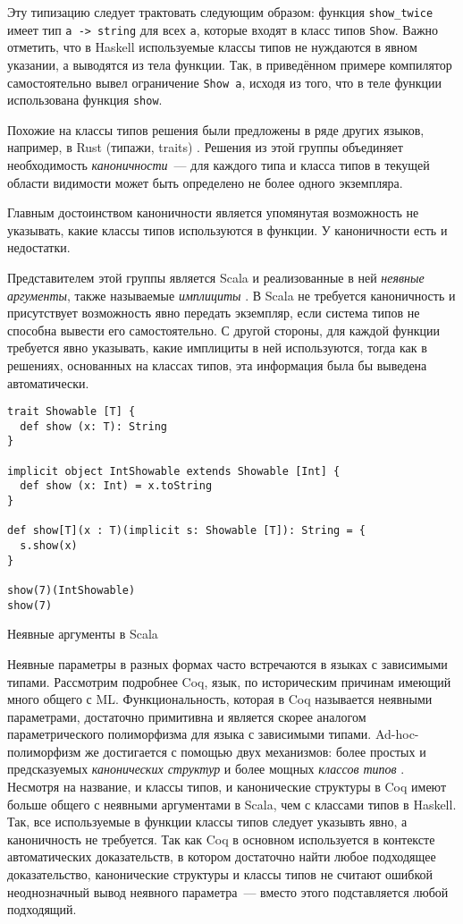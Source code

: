 \documentclass[../diploma.tex]{subfiles}
\begin{document}
Эту типизацию следует трактовать следующим образом: функция \texttt{show\_twice} имеет тип \texttt{a -> string} для всех \texttt{a}, которые входят в класс типов \texttt{Show}. Важно отметить, что в Haskell используемые классы типов не нуждаются в явном указании, а выводятся из тела функции. Так, в приведённом примере компилятор самостоятельно вывел ограничение \texttt{Show a}, исходя из того, что в теле функции использована функция \texttt{show}.

Похожие на классы типов решения были предложены в ряде других языков, например, в Rust (типажи, traits) \cite{rust}. Решения из этой группы объединяет необходимость \textit{каноничности}~--- для каждого типа и класса типов в текущей области видимости может быть определено не более одного экземпляра.

Главным достоинством каноничности является упомянутая возможность не указывать, какие классы типов используются в функции. У каноничности есть и недостатки. 

Представителем этой группы является Scala и реализованные в ней \textit{неявные аргументы}, также называемые \textit{имплициты} \cite{implicits}. В Scala не требуется каноничность и присутствует возможность явно передать экземпляр, если система типов не способна вывести его самостоятельно. С другой стороны, для каждой функции требуется явно указывать, какие имплициты в ней используются, тогда как в решениях, основанных на классах типов, эта информация была бы выведена автоматически.

\begin{listing}[H]
\begin{verbatim}
trait Showable [T] { 
  def show (x: T): String
}

implicit object IntShowable extends Showable [Int] {
  def show (x: Int) = x.toString
}

def show[T](x : T)(implicit s: Showable [T]): String = {
  s.show(x)
}

show(7)(IntShowable)
show(7)
\end{verbatim}
\caption{Неявные аргументы в Scala}
\label{lst:label}
\end{listing}

Неявные параметры в разных формах часто встречаются в языках с зависимыми типами. Рассмотрим подробнее Coq, язык, по историческим причинам имеющий много общего с ML. Функциональность, которая в Coq называется неявными параметрами, достаточно примитивна и является скорее аналогом параметрического полиморфизма для языка с зависимыми типами. Ad-hoc-полиморфизм же достигается с помощью двух механизмов: более простых и предсказуемых \textit{канонических структур} \cite{canonical_structures} и более мощных \textit{классов типов} \cite{coq_typeclasses}. Несмотря на название, и классы типов, и канонические структуры в Coq имеют больше общего с неявными аргументами в Scala, чем с классами типов в Haskell. Так, все используемые в функции классы типов следует указывть явно, а каноничность не требуется. Так как Coq в основном используется в контексте автоматических доказательств, в котором достаточно найти любое подходящее доказательство, канонические структуры и классы типов не считают ошибкой неоднозначный вывод неявного параметра~--- вместо этого подставляется любой подходящий.
\end{document}
